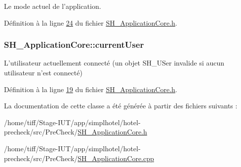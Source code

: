 Le mode actuel de l'application. 



Définition à la ligne \hyperlink{SH__ApplicationCore_8h_source_l00024}{24} du fichier \hyperlink{SH__ApplicationCore_8h_source}{S\-H\-\_\-\-Application\-Core.\-h}.

\hypertarget{classSH__ApplicationCore_aaa2609e7bcda83fd65b602e7e211b027}{
\subsubsection[{current\-User}]{\setlength{\rightskip}{0pt plus 5cm}S\-H\-\_\-\-Application\-Core\-::current\-User\hspace{0.3cm}{\ttfamily [read]}}}\label{classSH__ApplicationCore_aaa2609e7bcda83fd65b602e7e211b027}


L'utilisateur actuellement connecté (un objet S\-H\-\_\-\-U\-Ser invalide si aucun utilisateur n'est connecté) 



Définition à la ligne \hyperlink{SH__ApplicationCore_8h_source_l00019}{19} du fichier \hyperlink{SH__ApplicationCore_8h_source}{S\-H\-\_\-\-Application\-Core.\-h}.



La documentation de cette classe a été générée à partir des fichiers suivants \-:\begin{DoxyCompactItemize}
\item 
/home/tiff/\-Stage-\/\-I\-U\-T/app/simplhotel/hotel-\/precheck/src/\-Pre\-Check/\hyperlink{SH__ApplicationCore_8h}{S\-H\-\_\-\-Application\-Core.\-h}\item 
/home/tiff/\-Stage-\/\-I\-U\-T/app/simplhotel/hotel-\/precheck/src/\-Pre\-Check/\hyperlink{SH__ApplicationCore_8cpp}{S\-H\-\_\-\-Application\-Core.\-cpp}\end{DoxyCompactItemize}
